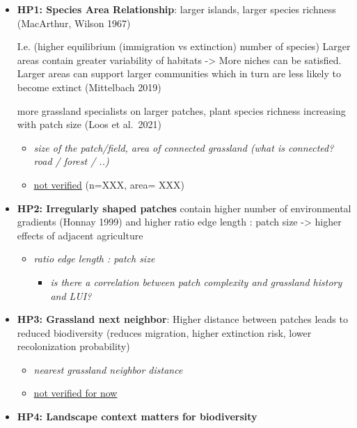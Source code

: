\documentclass[
  letterpaper,
  DIV=11,
  numbers=noendperiod]{scrartcl}
\providecommand{\tightlist}{%
  \setlength{\itemsep}{0pt}\setlength{\parskip}{0pt}}\usepackage{longtable,booktabs,array}
\begin{document}
\begin{itemize}
\item
  \textbf{HP1: Species Area Relationship}: larger islands, larger
  species richness (MacArthur, Wilson 1967)

  I.e. (higher equilibrium (immigration vs extinction) number of
  species) Larger areas contain greater variability of habitats
  -\textgreater{} More niches can be satisfied. Larger areas can support
  larger communities which in turn are less likely to become extinct
  (Mittelbach 2019)

  more grassland specialists on larger patches, plant species richness
  increasing with patch size (Loos et al.~2021)

  \begin{itemize}
  \item
    \emph{size of the patch/field, area of connected grassland (what is
    connected? road / forest / ..)}
  \item
    \uline{not verified} (n=XXX, area= XXX)
  \end{itemize}
\item
  \textbf{HP2: Irregularly shaped patches} contain higher number of
  environmental gradients (Honnay 1999) and higher ratio edge length :
  patch size -\textgreater{} higher effects of adjacent agriculture

  \begin{itemize}
  \item
    \emph{ratio edge length : patch size}

    \begin{itemize}
    \tightlist
    \item
      \emph{is there a correlation between patch complexity and
      grassland history and LUI?}
    \end{itemize}
  \end{itemize}
\item
  \textbf{HP3: Grassland next neighbor}: Higher distance between patches
  leads to reduced biodiversity (reduces migration, higher extinction
  risk, lower recolonization probability)

  \begin{itemize}
  \item
    \emph{nearest grassland neighbor distance}
  \item
    \uline{not verified for now}
  \end{itemize}
\item
  \textbf{HP4: Landscape context matters for biodiversity}


\end{itemize}
\end{document}
